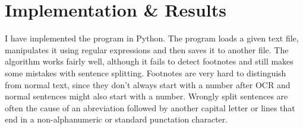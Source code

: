\documentclass{article}
\begin{document}
\section{Implementation \& Results}
I have implemented the program in Python. The program loads a given text file, manipulates it using regular expressions and then saves it to another file.
The algorithm works fairly well, although it fails to detect footnotes and still makes some mistakes with sentence splitting. Footnotes are very hard to distinguish from normal text, since they don't always start with a number after OCR and normal sentences might also start with a number. Wrongly split sentences are often the cause of an abreviation followed by another capital letter or lines that end in a non-alphanumeric or standard punctation character.
\end{document}
